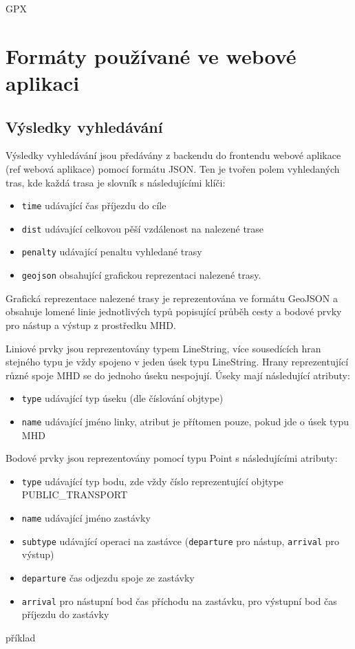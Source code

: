 \TODO GPX

\section{Formáty používané ve webové aplikaci}
\subsection{Výsledky vyhledávání}
Výsledky vyhledávání jsou předávány z backendu do frontendu webové aplikace
(\TODO ref webová aplikace) pomocí formátu JSON. Ten je tvořen polem vyhledaných
tras, kde každá trasa je slovník s následujícími klíči:
\begin{itemize}
	\item {\tt time} udávající čas příjezdu do cíle
	\item {\tt dist} udávající celkovou pěší vzdálenost na nalezené trase
	\item {\tt penalty} udávající penaltu vyhledané trasy
	\item {\tt geojson} obsahující grafickou reprezentaci nalezené trasy. 
\end{itemize}
Grafická reprezentace nalezené trasy je reprezentována ve formátu GeoJSON a
obsahuje lomené linie jednotlivých typů popisující průběh cesty a bodové prvky
pro nástup a výstup z prostředku MHD.

Liniové prvky jsou reprezentovány typem LineString, více sousedících hran
stejného typu je vždy spojeno v jeden úsek typu LineString. Hrany reprezentující různé
spoje MHD se do jednoho úseku nespojují. Úseky mají následující atributy: 
\begin{itemize}
	\item {\tt type} udávající typ úseku (dle číslování objtype)
	\item {\tt name} udávající jméno linky, atribut je přítomen pouze, pokud
	jde o úsek typu MHD
\end{itemize}
Bodové prvky jsou reprezentovány pomocí typu Point s následujícími atributy: 
\begin{itemize}
	\item {\tt type} udávající typ bodu, zde vždy číslo reprezentující objtype PUBLIC\_TRANSPORT  	
	\item {\tt name} udávající jméno zastávky
	\item {\tt subtype} udávající operaci na zastávce ({\tt departure} pro
	nástup, {\tt arrival} pro výstup)
	\item {\tt departure} čas odjezdu spoje ze zastávky
	\item {\tt arrival} pro nástupní bod čas příchodu na zastávku, pro
	výstupní bod čas příjezdu do zastávky
\end{itemize}
\TODO příklad
